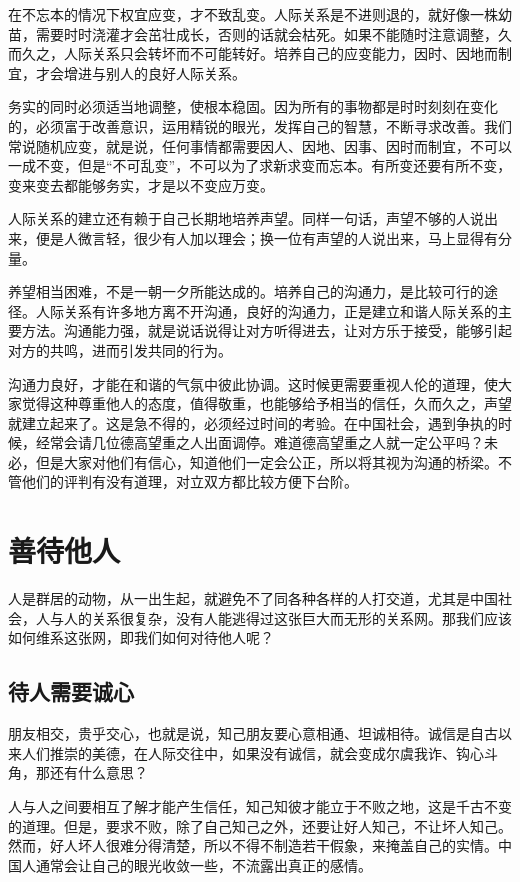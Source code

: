 \documentclass[fontset=fandol, a4paper, 12pt, openright]{ctexbook}
\begin{document}
在不忘本的情况下权宜应变，才不致乱变。人际关系是不进则退的，就好像一株幼苗，需要时时浇灌才会茁壮成长，否则的话就会枯死。如果不能随时注意调整，久而久之，人际关系只会转坏而不可能转好。培养自己的应变能力，因时、因地而制宜，才会增进与别人的良好人际关系。

务实的同时必须适当地调整，使根本稳固。因为所有的事物都是时时刻刻在变化的，必须富于改善意识，运用精锐的眼光，发挥自己的智慧，不断寻求改善。我们常说随机应变，就是说，任何事情都需要因人、因地、因事、因时而制宜，不可以一成不变，但是“不可乱变”，不可以为了求新求变而忘本。有所变还要有所不变，变来变去都能够务实，才是以不变应万变。

人际关系的建立还有赖于自己长期地培养声望。同样一句话，声望不够的人说出来，便是人微言轻，很少有人加以理会；换一位有声望的人说出来，马上显得有分量。

养望相当困难，不是一朝一夕所能达成的。培养自己的沟通力，是比较可行的途径。人际关系有许多地方离不开沟通，良好的沟通力，正是建立和谐人际关系的主要方法。沟通能力强，就是说话说得让对方听得进去，让对方乐于接受，能够引起对方的共鸣，进而引发共同的行为。

沟通力良好，才能在和谐的气氛中彼此协调。这时候更需要重视人伦的道理，使大家觉得这种尊重他人的态度，值得敬重，也能够给予相当的信任，久而久之，声望就建立起来了。这是急不得的，必须经过时间的考验。在中国社会，遇到争执的时候，经常会请几位德高望重之人出面调停。难道德高望重之人就一定公平吗？未必，但是大家对他们有信心，知道他们一定会公正，所以将其视为沟通的桥梁。不管他们的评判有没有道理，对立双方都比较方便下台阶。


\chapter{善待他人}
人是群居的动物，从一出生起，就避免不了同各种各样的人打交道，尤其是中国社会，人与人的关系很复杂，没有人能逃得过这张巨大而无形的关系网。那我们应该如何维系这张网，即我们如何对待他人呢？

\section{待人需要诚心}

朋友相交，贵乎交心，也就是说，知己朋友要心意相通、坦诚相待。诚信是自古以来人们推崇的美德，在人际交往中，如果没有诚信，就会变成尔虞我诈、钩心斗角，那还有什么意思？

人与人之间要相互了解才能产生信任，知己知彼才能立于不败之地，这是千古不变的道理。但是，要求不败，除了自己知己之外，还要让好人知己，不让坏人知己。然而，好人坏人很难分得清楚，所以不得不制造若干假象，来掩盖自己的实情。中国人通常会让自己的眼光收敛一些，不流露出真正的感情。
\end{document}
